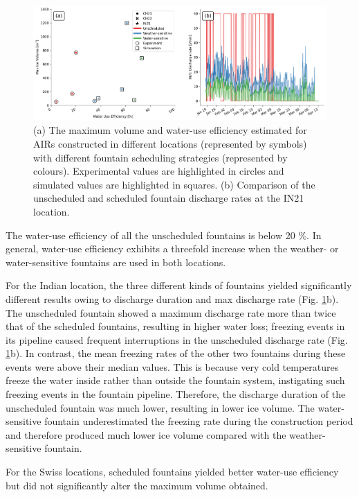 \begin{figure}[htb]
	\includegraphics[width=\textwidth]{figs/wue.png}

	\caption{(a) The maximum volume and water-use efficiency estimated for AIRs constructed in different locations
		(represented by symbols) with different fountain scheduling strategies (represented by colours). Experimental
		values are highlighted in circles and simulated values are highlighted in squares. (b) Comparison of
		the unscheduled and scheduled fountain discharge rates at the IN21 location.}

	\label{fig:wue}
\end{figure}

The water-use efficiency of all the unscheduled fountains is below 20 \%. In general, water-use efficiency
exhibits a threefold increase when the weather- or water-sensitive fountains are used in both
locations.

For the Indian location, the three different kinds of fountains yielded significantly different results owing to discharge
duration and max discharge rate
(Fig. \ref{fig:wue}b). The unscheduled fountain showed a maximum discharge rate more than twice that of
the scheduled fountains, resulting in higher water loss; freezing events in its pipeline caused frequent
interruptions in the unscheduled discharge rate (Fig. \ref{fig:wue}b). In contrast, the mean freezing
rates of the other two fountains during these events were above their median values. This is because very cold
temperatures freeze the water inside rather than outside the fountain system, instigating such freezing events in
the fountain pipeline. Therefore, the discharge duration of the unscheduled fountain was much lower, resulting in
lower ice volume. The water-sensitive fountain underestimated the freezing rate during the construction period
and therefore produced much lower ice volume compared with the weather-sensitive fountain.

For the Swiss locations, scheduled fountains yielded better water-use efficiency but did not significantly alter the maximum
volume obtained.

